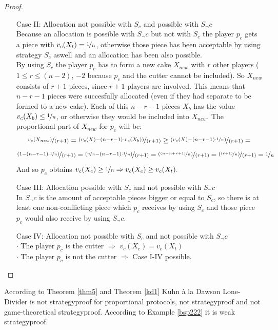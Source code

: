 \begin{proof}
\begin{itemize}
\item[Case] II: Allocation not possible with $S_c$ and possible with $S_\neg c$\\
Because an allocation is possible with $S_\neg c$ but not with $S_c$ the player $p_c$ gets a piece with $v_c(X_t)=\nicefrac{1}{n}$, otherwise those piece has been acceptable by using strategy $S_c$ aswell and an allocation has been also possible.\\
By using $S_c$ the player $p_c$ has to form a new cake $X_{new}$ with $r$ other players ($1 \leq r \leq (n-2)$, $-2$ because $p_c$ and the cutter cannot be included). So $X_{new}$ consists of $r+1$ pieces, since $r+1$ players are involved. This means that $n-r-1$ pieces were succesfully allocated (even if they had separate to be formed to a new cake). Each of this $n-r-1$ pieces $X_b$ has the value $v_c(X_b) \leq \nicefrac{1}{n}$, or otherwise they would be included into $X_{new}$. The proportional part of $X_{new}$ for $p_c$ will be:
$$\nicefrac{v_c(X_{new})}{(r+1)}=\nicefrac{(v_c(X)-(n-r-1)\cdot v_c(X_b))}{(r+1)} \geq \nicefrac{(v_c(X)-(n-r-1) \cdot \nicefrac{1}{n})}{(r+1)}=$$$$\nicefrac{(1-(n-r-1)\cdot \nicefrac{1}{n})}{(r+1)}=\nicefrac{(\nicefrac{n}{n}-(n-r-1) \cdot \nicefrac{1}{n})}{(r+1)}=\nicefrac{(\nicefrac{(n-n+r+1)}{n})}{(r+1)}=\nicefrac{(\nicefrac{(r+1)}{n})}{(r+1)}=\nicefrac{1}{n}$$
And so $p_c$ obtains $v_c(X_c)\geq \nicefrac{1}{n}\Rightarrow v_c(X_c)\geq v_c(X_t).$ 
\item[Case] III: Allocation possible with $S_c$ and not possible with $S_\neg c$ \blitza\\
In $S_\neg c$ is the amount of acceptable pieces bigger or equal to $S_c$, so there is at least one non-conflicting piece which $p_c$ receives by using $S_c$ and those piece $p_c$ would also receive by using $S_\neg c$.
\item[Case] IV: Allocation not possible with $S_c$ and not possible with $S_\neg c$\\
$\cdot$ The player $p_c$ is the cutter $\Rightarrow$ $v_c(X_c)=v_c(X_t)$\\
$\cdot$ The player $p_c$ is not the cutter $\Rightarrow$ Case I-IV possible.
\end{itemize}
\end{proof}
\begin{bezeichnungen}
According to Theorem \ref{thm5} and Theorem \ref{kd1} Kuhn à la Dawson Lone-Divider is not strategyproof for proportional protocols, not strategyproof and not game-theoretical strategyproof. According to Example \ref{bsp222} it is weak strategyproof.
\end{bezeichnungen}
\newpage
